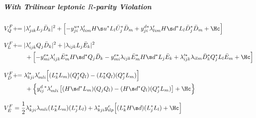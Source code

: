 \subparagraph{With Trilinear leptonic $R$-parity Violation}
\begin{align}
 V^F_{Q}   &  +\!\! =
|\lambda'_{jik}L_j\bD_k|^2
+\Bigl[
-y^{u*}_{ji}\lambda'_{lim}\Hu^*L_l\bU^*_j\bD_m
+y^{d*}_{ji}\lambda'_{lim}\Hd^*L_l\bD^*_j\bD_m+\Hc
\Bigr]\\[8pt]
 V^F_{L}& +\!\!=
|\lambda'_{ijk}Q_j\bD_k|^2+|\lambda_{ijk}L_j\bE_k|^2
\notag\\&\qquad
+\Bigl[
-y^{e*}_{mi}\lambda'_{ijk}\bE^*_m\Hd^*Q_j\bD_k
-y^{e*}_{mi}\lambda_{ijk} \bE^*_m\Hd^*L_j\bE_k
+\lambda'^*_{ijk}\lambda_{ilm}\bD_k^*Q_j^*L_l\bE_m+\Hc
\Bigr]\\[8pt]
 V^F_{\bD}&+\!\!=
\lambda'^*_{kji}\lambda'_{mli}\Bigl[(L_k^*L_m)(Q_j^*Q_l) -(L_k^*Q_l)(Q_j^*L_m)\Bigr]
\notag\\&\qquad
+\Bigl\{y^d_{ij}{}^*\lambda'_{mli}\left[(\Hd^*L_m)(Q_jQ_l)-(\Hd^*Q_l)(Q_j^*L_m)\right]+\Hc\Bigr\}
\\[8pt]
 V^F_{\bE}&=
\frac12\lambda_{kji}^*\lambda_{mli}(L_k^*L_m)(L_j^*L_l)+
\lambda_{kji}^*y^e_{ilp}\Bigl[(L_k^*\Hd)(L^*_jL_l)+\Hc\Bigr]
\end{align}



